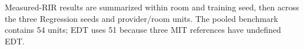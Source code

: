 \documentclass{article}
\begin{document}
Measured-RIR results are summarized within room and training seed, then across
the three Regression seeds and provider/room units. The pooled benchmark
contains 54 units; EDT uses 51 because three MIT references have undefined EDT.




\end{document}
